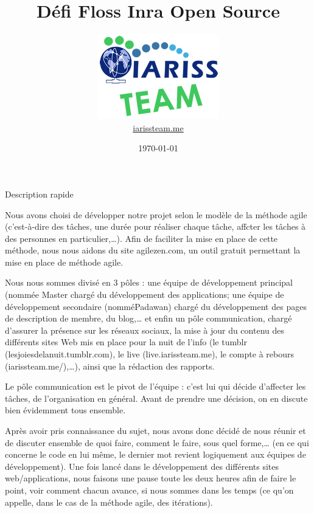 \documentclass[12pt, a4paper]{article}
\title{Défi Floss Inra Open Source}
\newcommand{\espace}{\vspace{.8cm}}
\begin{document}
\author{\includegraphics{../_img/iariss_team.png} \\ {\sffamily \href{http://iarissteam.me}{iarissteam.me}}}
\date{\today}

\maketitle{}

{\sffamily Description rapide} 

\espace{}
Nous avons choisi de développer notre projet selon le modèle de la méthode agile (c'est-à-dire des tâches, une durée pour réaliser chaque tâche, affcter les tâches à des personnes en particulier,\ldots{}). Afin de faciliter la mise en place de cette méthode, nous nous aidons du site agilezen.com, un outil gratuit permettant la mise en place de méthode agile.

Nous nous sommes divisé en 3 pôles : une équipe de développement principal (nommée \og{}Master\fg{} chargé du développement des applications; une équipe de développement secondaire (nommé\og{}Padawan\fg{}) chargé du développement des pages de description de membre, du blog,\ldots{} et enfin un pôle communication, chargé d'assurer la présence sur les réseaux sociaux, la mise à jour du contenu des différents sites Web mis en place pour la nuit de l'info (le tumblr (lesjoiesdelanuit.tumblr.com), le live (live.iarissteam.me), le compte à rebours (iarissteam.me/),\ldots{}), ainsi que la rédaction des rapports.

Le pôle communication est le pivot de l'équipe : c'est lui qui décide d'affecter les tâches, de l'organisation en général. Avant de prendre une décision, on en discute bien évidemment tous ensemble.

Après avoir pris connaissance du sujet, nous avons donc décidé de nous réunir et de discuter ensemble de quoi faire, comment le faire, sous quel forme,\ldots{} (en ce qui concerne le code en lui même, le dernier mot revient logiquement aux équipes de développement). Une fois lancé dans le développement des différents sites web/applications, nous faisons une pause toute les deux heures afin de faire le point, voir comment chacun avance, si nous sommes dans les temps (ce qu'on appelle, dans le cas de la méthode agile, des \og{}itérations\fg{}).
\end{document}
